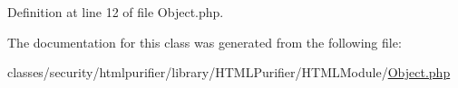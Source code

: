 Definition at line 12 of file Object.\+php.



The documentation for this class was generated from the following file\+:\begin{DoxyCompactItemize}
\item 
classes/security/htmlpurifier/library/\+H\+T\+M\+L\+Purifier/\+H\+T\+M\+L\+Module/\hyperlink{Object_8php}{Object.\+php}\end{DoxyCompactItemize}
